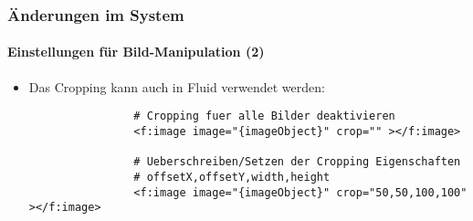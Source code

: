 \begin{frame}[fragile]
	\frametitle{Änderungen im System}
	\framesubtitle{Einstellungen für Bild-Manipulation (2)}

	\begin{itemize}
		\item Das Cropping kann auch in Fluid verwendet werden:
			\begin{lstlisting}
				# Cropping fuer alle Bilder deaktivieren
				<f:image image="{imageObject}" crop="" ></f:image>

				# Ueberschreiben/Setzen der Cropping Eigenschaften
				# offsetX,offsetY,width,height
				<f:image image="{imageObject}" crop="50,50,100,100" ></f:image>
			\end{lstlisting}

	\end{itemize}

\end{frame}

